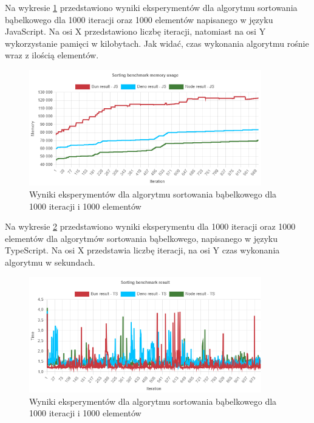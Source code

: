 Na wykresie \ref{fig:bubble_sorting_e3_memory_js} przedstawiono wyniki eksperymentów dla algorytmu sortowania bąbelkowego dla 1000 iteracji oraz 1000 elementów napisanego w języku JavaScript. Na osi X przedstawiono liczbę iteracji, natomiast na osi Y wykorzystanie pamięci w kilobytach. Jak widać, czas wykonania algorytmu rośnie wraz z ilością elementów.
\begin{figure}[H]
  \centering
  \includegraphics[width=0.9\textwidth]{Figures/sorting/bubble/e3_memory_js.png}
  \caption{Wyniki eksperymentów dla algorytmu sortowania bąbelkowego dla 1000 iteracji i 1000 elementów}
  \label{fig:bubble_sorting_e3_memory_js}
\end{figure}

Na wykresie \ref{fig:bubble_sorting_e3_ts} przedstawiono wyniki eksperymentu dla 1000 iteracji oraz 1000 elementów dla algorytmów sortowania bąbelkowego, napisanego w języku TypeScript. Na osi X przedstawia liczbę iteracji, na osi Y czas wykonania algorytmu w sekundach. 

\begin{figure}[H]
  \centering
  \includegraphics[width=0.9\textwidth]{Figures/sorting/bubble/e3_ts.png}
  \caption{Wyniki eksperymentów dla algorytmu sortowania bąbelkowego dla 1000 iteracji i 1000 elementów}
  \label{fig:bubble_sorting_e3_ts}
\end{figure}

